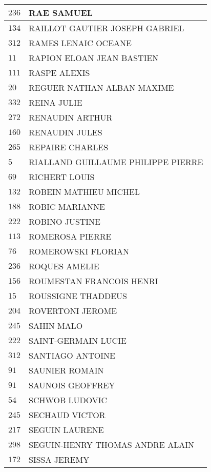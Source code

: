 \begin{xltabular}{\linewidth}{|l|X|}
    \hline
    $236$ & RAE SAMUEL \\
    \hline
    $134$ & RAILLOT GAUTIER JOSEPH GABRIEL \\
    \hline
    $312$ & RAMES LENAIC OCEANE \\
    \hline
    $11$ & RAPION ELOAN JEAN BASTIEN \\
    \hline
    $111$ & RASPE ALEXIS \\
    \hline
    $20$ & REGUER NATHAN ALBAN MAXIME \\
    \hline
    $332$ & REINA JULIE \\
    \hline
    $272$ & RENAUDIN ARTHUR \\
    \hline
    $160$ & RENAUDIN JULES \\
    \hline
    $265$ & REPAIRE CHARLES \\
    \hline
    $5$ & RIALLAND GUILLAUME PHILIPPE PIERRE \\
    \hline
    $69$ & RICHERT LOUIS \\
    \hline
    $132$ & ROBEIN MATHIEU MICHEL \\
    \hline
    $188$ & ROBIC MARIANNE \\
    \hline
    $222$ & ROBINO JUSTINE \\
    \hline
    $113$ & ROMEROSA PIERRE \\
    \hline
    $76$ & ROMEROWSKI FLORIAN \\
    \hline
    $236$ & ROQUES AMELIE \\
    \hline
    $156$ & ROUMESTAN FRANCOIS HENRI \\
    \hline
    $15$ & ROUSSIGNE THADDEUS \\
    \hline
    $204$ & ROVERTONI JEROME \\
    \hline
    $245$ & SAHIN MALO \\
    \hline
    $222$ & SAINT-GERMAIN LUCIE \\
    \hline
    $312$ & SANTIAGO ANTOINE \\
    \hline
    $91$ & SAUNIER ROMAIN \\
    \hline
    $91$ & SAUNOIS GEOFFREY \\
    \hline
    $54$ & SCHWOB LUDOVIC \\
    \hline
    $245$ & SECHAUD VICTOR \\
    \hline
    $217$ & SEGUIN LAURENE \\
    \hline
    $298$ & SEGUIN-HENRY THOMAS ANDRE ALAIN \\
    \hline
    $172$ & SISSA JEREMY \\

\end{xltabular}
